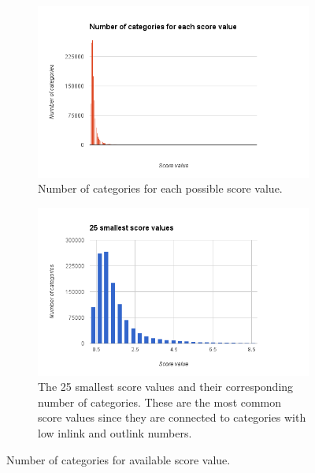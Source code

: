 \begin{figure}[h]
\centering
\begin{subfigure}[b]{\textwidth}
\includegraphics[width=\textwidth]{Chapters/Implementation/Grading/Inlinkoutlink_scorevalue_numberofcategories}
\caption{Number of categories for each possible score value.}
\label{fig:scorevalue}
\end{subfigure}
\begin{subfigure}[b]{\textwidth}
\includegraphics[width=\textwidth]{Chapters/Implementation/Grading/25_smalles_score_values}
\caption{The 25 smallest score values and their corresponding number of categories. These are the most common score values since they are connected to categories with low inlink and outlink numbers.}
\label{fig:25_smallest}
\end{subfigure}
\caption{Number of categories for available score value. }
\label{fig:score_values}
\end{figure}




